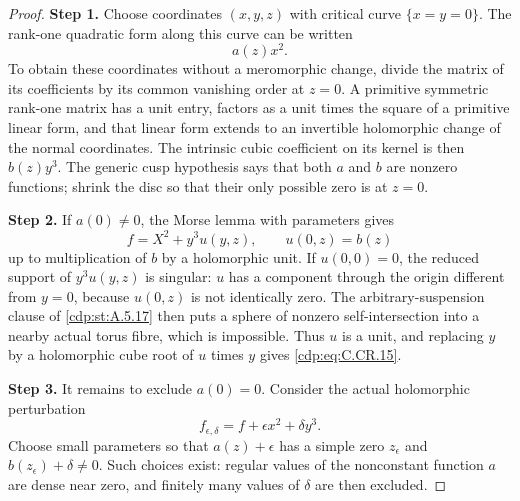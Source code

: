 \begin{proof}
\noindent\textbf{Step 1.} Choose coordinates $(x,y,z)$ with critical curve
$\{x=y=0\}$. The rank-one quadratic form along this curve
can be written
\[
 a(z)x^2.
\]
To obtain these coordinates without a meromorphic change,
divide the matrix of its coefficients by its common
vanishing order at $z=0$. A primitive symmetric rank-one
matrix has a unit entry, factors as a unit times the
square of a primitive linear form, and that linear form
extends to an invertible holomorphic change of the normal
coordinates. The intrinsic cubic coefficient on its
kernel is then $b(z)y^3$. The generic cusp hypothesis says
that both $a$ and $b$ are nonzero functions; shrink the
disc so that their only possible zero is at $z=0$.

\noindent\textbf{Step 2.} If $a(0)\ne0$, the Morse lemma with parameters gives
\[
 f=X^2+y^3u(y,z),\qquad u(0,z)=b(z)
\]
up to multiplication of $b$ by a holomorphic unit.
If $u(0,0)=0$, the reduced support of $y^3u(y,z)$ is
singular: $u$ has a component through the origin
different from $y=0$, because $u(0,z)$ is not identically
zero. The arbitrary-suspension clause of \ref{cdp:st:A.5.17} then
puts a sphere of nonzero self-intersection into a
nearby actual torus fibre, which is impossible.
Thus $u$ is a unit, and replacing $y$ by a holomorphic
cube root of $u$ times $y$ gives \eqref{cdp:eq:C.CR.15}.

\noindent\textbf{Step 3.} It remains to exclude $a(0)=0$. Consider the actual
holomorphic perturbation
\[
                  f_{\epsilon,\delta}
                      =f+\epsilon x^2+\delta y^3.
 \tag{C.CR.16}\label{cdp:eq:C.CR.16}
\]
Choose small parameters so that $a(z)+\epsilon$ has a
simple zero $z_\epsilon$ and
$b(z_\epsilon)+\delta\ne0$. Such choices exist:
regular values of the nonconstant function $a$ are
dense near zero, and finitely many values of $\delta$
are then excluded.


\end{proof}
